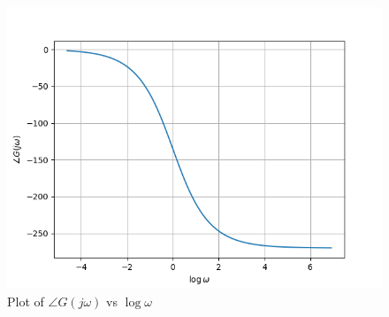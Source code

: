 \documentclass[journal,12pt,twocolumn]{IEEEtran}
\theoremstyle{remark}
\begin{document}
\begin{figure}[htbp]
	\includegraphics[width=\columnwidth]{figs/phase.png}
	\caption{Plot of $\angle G(j\omega)$ vs $\log{\omega}$}
	\label{fig:phase/w}
\end{figure}
\end{document}
